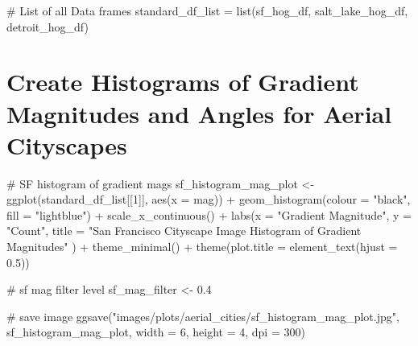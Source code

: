 \documentclass[
  letterpaper,
  DIV=11,
  numbers=noendperiod]{scrreprt}
\newenvironment{Shaded}{\begin{snugshade}}{\end{snugshade}}
\newcommand{\AttributeTok}[1]{\textcolor[rgb]{0.40,0.45,0.13}{#1}}
\newcommand{\CommentTok}[1]{\textcolor[rgb]{0.37,0.37,0.37}{#1}}
\newcommand{\DecValTok}[1]{\textcolor[rgb]{0.68,0.00,0.00}{#1}}
\newcommand{\FloatTok}[1]{\textcolor[rgb]{0.68,0.00,0.00}{#1}}
\newcommand{\FunctionTok}[1]{\textcolor[rgb]{0.28,0.35,0.67}{#1}}
\newcommand{\NormalTok}[1]{\textcolor[rgb]{0.00,0.23,0.31}{#1}}
\newcommand{\OtherTok}[1]{\textcolor[rgb]{0.00,0.23,0.31}{#1}}
\newcommand{\SpecialCharTok}[1]{\textcolor[rgb]{0.37,0.37,0.37}{#1}}
\newcommand{\StringTok}[1]{\textcolor[rgb]{0.13,0.47,0.30}{#1}}
\begin{document}
\begin{Shaded}
\begin{Highlighting}[]
\CommentTok{\# List of all Data frames}
\NormalTok{standard\_df\_list }\OtherTok{=} \FunctionTok{list}\NormalTok{(sf\_hog\_df,}
\NormalTok{                        salt\_lake\_hog\_df, }
\NormalTok{                        detroit\_hog\_df)}
\end{Highlighting}
\end{Shaded}

\section{Create Histograms of Gradient Magnitudes and Angles for Aerial
Cityscapes}\label{create-histograms-of-gradient-magnitudes-and-angles-for-aerial-cityscapes}

\begin{Shaded}
\begin{Highlighting}[]
\CommentTok{\# SF histogram of gradient mags}
\NormalTok{sf\_histogram\_mag\_plot }\OtherTok{\textless{}{-}}
  \FunctionTok{ggplot}\NormalTok{(standard\_df\_list[[}\DecValTok{1}\NormalTok{]], }
         \FunctionTok{aes}\NormalTok{(}\AttributeTok{x =}\NormalTok{ mag)) }\SpecialCharTok{+}
  \FunctionTok{geom\_histogram}\NormalTok{(}\AttributeTok{colour =} \StringTok{"black"}\NormalTok{, }\AttributeTok{fill =} \StringTok{"lightblue"}\NormalTok{) }\SpecialCharTok{+}
  \FunctionTok{scale\_x\_continuous}\NormalTok{() }\SpecialCharTok{+} 
  \FunctionTok{labs}\NormalTok{(}\AttributeTok{x =} \StringTok{"Gradient Magnitude"}\NormalTok{, }
       \AttributeTok{y =} \StringTok{"Count"}\NormalTok{, }
       \AttributeTok{title =} \StringTok{"San Francisco Cityscape Image Histogram of Gradient Magnitudes"}
\NormalTok{       ) }\SpecialCharTok{+}
  \FunctionTok{theme\_minimal}\NormalTok{() }\SpecialCharTok{+}
  \FunctionTok{theme}\NormalTok{(}\AttributeTok{plot.title =} \FunctionTok{element\_text}\NormalTok{(}\AttributeTok{hjust =} \FloatTok{0.5}\NormalTok{))}

\CommentTok{\# sf mag filter level}
\NormalTok{sf\_mag\_filter }\OtherTok{\textless{}{-}} \FloatTok{0.4}

\CommentTok{\# save image}
\FunctionTok{ggsave}\NormalTok{(}\StringTok{"images/plots/aerial\_cities/sf\_histogram\_mag\_plot.jpg"}\NormalTok{, sf\_histogram\_mag\_plot, }\AttributeTok{width =} \DecValTok{6}\NormalTok{, }\AttributeTok{height =} \DecValTok{4}\NormalTok{, }\AttributeTok{dpi =} \DecValTok{300}\NormalTok{)}
\end{Highlighting}
\end{Shaded}
\end{document}
